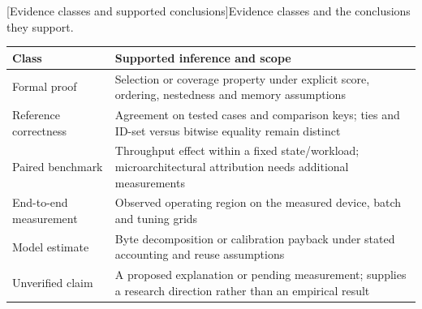 \par\medskip\noindent\begin{minipage}{\linewidth}
\centering\captionsetup{hypcap=false}
[Evidence classes and supported conclusions]{Evidence classes and the conclusions they support.}
\label{tab:3-evidence}
\footnotesize\setlength{\tabcolsep}{4pt}
\begin{tabularx}{\linewidth}{@{}>{\raggedright\arraybackslash}p{.24\linewidth}>{\raggedright\arraybackslash}X@{}}
\toprule
Class & Supported inference and scope \\
\midrule
Formal proof & Selection or coverage property under explicit score,
ordering, nestedness and memory assumptions \\
Reference correctness & Agreement on tested cases and comparison keys;
ties and ID-set versus bitwise equality remain distinct \\
Paired benchmark & Throughput effect within a fixed state/workload;
microarchitectural attribution needs additional measurements \\
End-to-end measurement & Observed operating region on the measured
device, batch and tuning grids \\
Model estimate & Byte decomposition or calibration payback under stated
accounting and reuse assumptions \\
Unverified claim & A proposed explanation or pending measurement;
supplies a research direction rather than an empirical result \\
\bottomrule
\end{tabularx}
\end{minipage}\par\medskip
